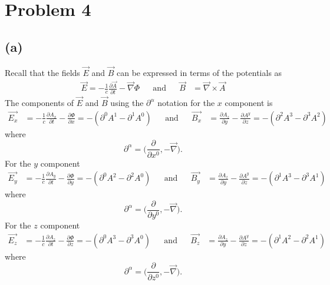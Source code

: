 \documentclass[11pt]{article}
\begin{document}
\clearpage


\section*{Problem 4}

\subsection*{(a)}

Recall that the fields $\vec{E}$ and $\vec{B}$ can be expressed in terms of the potentials as 
\begin{align*}
    \vec{E} = - \frac{1}{c} \frac{\partial \vec{A}}{\partial t} - \vec{\nabla} \Phi && \text{and} && \vec{B} &= \vec{\nabla} \times \vec{A}
\end{align*}
The components of $\vec{E}$ and $\vec{B}$ using the $\partial^{\alpha}$ notation for the $x$ component is
\begin{align*}
    \vec{E_{x}} &= -\frac{1}{c}\frac{\partial A_{x}}{\partial t} - \frac{\partial \Phi}{\partial x} = -(\partial^{0}A^{1} - \partial^{1}A^{0}) 
    && \text{and} &&
    \vec{B_{x}} &= \frac{\partial A_{z}}{\partial y} - \frac{\partial A^{y}}{\partial z} = -(\partial^{2}A^{3} - \partial^{3}A^{2})
\end{align*}
where
$$
\partial^{\alpha} = \Bigg(\frac{\partial}{\partial x^{0}}, -\vec{\nabla}\Bigg).
$$
For the $y$ component
\begin{align*}
    \vec{E_{y}} &= -\frac{1}{c}\frac{\partial A_{y}}{\partial t} - \frac{\partial \Phi}{\partial y} = -(\partial^{0}A^{2} - \partial^{2}A^{0}) 
    && \text{and} &&
    \vec{B_{y}} &= \frac{\partial A_{z}}{\partial y} - \frac{\partial A^{y}}{\partial z} = -(\partial^{1}A^{3} - \partial^{3}A^{1})
\end{align*}
where
$$
\partial^{\alpha} = \Bigg(\frac{\partial}{\partial y^{0}}, -\vec{\nabla}\Bigg).
$$
For the $z$ component 
\begin{align*}
    \vec{E_{z}} &= -\frac{1}{c}\frac{\partial A_{z}}{\partial t} - \frac{\partial \Phi}{\partial z} = -(\partial^{0}A^{3} - \partial^{3}A^{0}) 
    && \text{and} &&
    \vec{B_{z}} &= \frac{\partial A_{z}}{\partial y} - \frac{\partial A^{y}}{\partial z} = -(\partial^{1}A^{2} - \partial^{2}A^{1})
\end{align*}
where
$$
\partial^{\alpha} = \Bigg(\frac{\partial}{\partial z^{0}}, -\vec{\nabla}\Bigg).
$$
\end{document}
